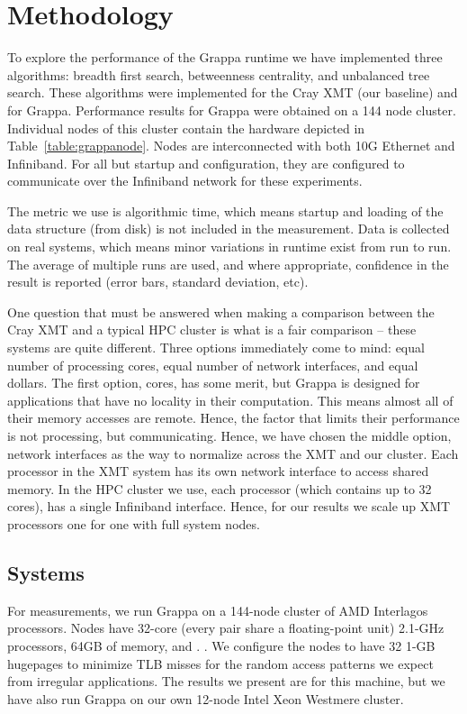 \section{Methodology} \label{sec:method}

To explore the performance of the Grappa runtime we have implemented three algorithms: breadth first search, betweenness centrality, and unbalanced tree search.  These algorithms were implemented for the Cray XMT (our baseline) and for Grappa.  Performance results for Grappa were obtained on a 144 node cluster.  Individual nodes of this cluster contain the hardware depicted in Table~\ref{table:grappanode}.  Nodes are interconnected with both 10G Ethernet and Infiniband.  For all but startup and configuration, they are configured to communicate over the Infiniband network for these experiments.

The metric we use is algorithmic time, which means startup and loading of the data structure (from disk) is not included in the measurement.  Data is collected on real systems, which means minor variations in runtime exist from run to run.  The average of multiple runs are used, and where appropriate, confidence in the result is reported (error bars, standard deviation, etc).

One question that must be answered when making a comparison between
the Cray XMT and a typical HPC cluster is what is a fair comparison --
these systems are quite different.  Three options immediately come to
mind: equal number of processing cores, equal number of network
interfaces, and equal dollars.    The first option, cores,
has some merit, but Grappa is designed for applications that have no
locality in their computation.  This means almost all of their memory
accesses are remote.  Hence, the factor that limits their performance
is not processing, but communicating.  Hence, we have chosen the
middle option, network interfaces as the way to normalize across the
XMT and our cluster.  Each processor in the XMT system has its own
network interface to access shared memory.  In the HPC cluster we use,
each processor (which contains up to 32 cores), has a single Infiniband interface.  Hence, for our results we scale up XMT processors one for one with full system nodes.



\subsection{Systems}
For measurements, we run Grappa on a 144-node cluster of AMD
Interlagos processors. Nodes have 32-core (every pair share a floating-point
unit) 2.1-GHz processors, 64GB of memory, and . . We configure the nodes to have 32 1-GB
hugepages to minimize TLB misses for the random access patterns we
expect from irregular applications. The results we present are for
this machine, but we have also run Grappa on our own 12-node Intel
Xeon Westmere cluster.

